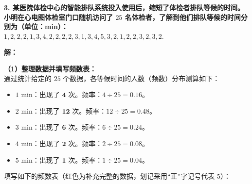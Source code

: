 \vspace{0.6cm}

\textbf{3. 某医院体检中心的智能排队系统投入使用后，缩短了体检者排队等候的时间。小明在心电图体检室门口随机访问了 $25$ 名体检者，了解到他们排队等候的时间分别为（单位：min）：\\
$1, 2, 2, 2, 1, 3, 4, 2, 2, 2, 2, 3, 1, 3, 4, 5, 3, 2, 1, 2, 2, 3, 2, 3, 2.$}

\vspace{0.4cm}

\textbf{解：}

\textbf{（1）整理数据并填写频数表：} \\
通过统计给定的 $25$ 个数据，各等候时间的人数（频数）分布测算如下：
\begin{itemize}
  \item \textbf{$1\text{ min}$}：出现了 $\boldsymbol{4}$ 次。频率：$4 \div 25 = \boldsymbol{0.16}$。
  \item \textbf{$2\text{ min}$}：出现了 $\boldsymbol{12}$ 次。频率：$12 \div 25 = \boldsymbol{0.48}$。
  \item \textbf{$3\text{ min}$}：出现了 $\boldsymbol{6}$ 次。频率：$6 \div 25 = \boldsymbol{0.24}$。
  \item \textbf{$4\text{ min}$}：出现了 $\boldsymbol{2}$ 次。频率：$2 \div 25 = \boldsymbol{0.08}$。
  \item \textbf{$5\text{ min}$}：出现了 $\boldsymbol{1}$ 次。频率：$1 \div 25 = \boldsymbol{0.04}$。
\end{itemize}

填写如下的频数表（红色为补充完整的数据，划记采用“正”字记号代表 $5$）：

